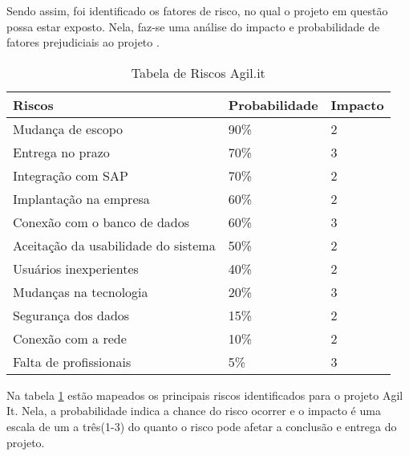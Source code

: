 Sendo assim, foi identificado os fatores de risco, no qual o projeto em questão possa estar exposto. Nela, faz-se uma análise do impacto e probabilidade de fatores prejudiciais ao projeto .
\newpage
\begin{table}[]
	\begin{tabular}{|l|l|l|}
		\hline
		\rowcolor[HTML]{EFEFEF} 
		\textbf{Riscos}                     & \textbf{Probabilidade} & \textbf{Impacto} \\ \hline
		\rowcolor[HTML]{DD7346} 
		Mudança de escopo                   & 90\%                   & 2                \\ \hline
		\rowcolor[HTML]{DD7346} 
		Entrega no prazo                    & 70\%                   & 3                \\ \hline
		\rowcolor[HTML]{DD7346} 
		Integração com SAP                  & 70\%                   & 2                \\ \hline
		\rowcolor[HTML]{FFFE65} 
		Implantação na empresa              & 60\%                   & 2                \\ \hline
		\rowcolor[HTML]{FFFE65} 
		Conexão com o banco de dados        & 60\%                   & 3                \\ \hline
		\rowcolor[HTML]{FFFE65} 
		Aceitação da usabilidade do sistema & 50\%                   & 2                \\ \hline
		\rowcolor[HTML]{FFFE65} 
		Usuários inexperientes              & 40\%                   & 2                \\ \hline
		\rowcolor[HTML]{9AFF99} 
		Mudanças na tecnologia              & 20\%                   & 3                \\ \hline
		\rowcolor[HTML]{9AFF99} 
		Segurança dos dados                 & 15\%                   & 2                \\ \hline
		\rowcolor[HTML]{9AFF99} 
		Conexão com a rede                  & 10\%                   & 2                \\ \hline
		\rowcolor[HTML]{9AFF99} 
		Falta de profissionais              & 5\%                    & 3                \\ \hline
	\end{tabular}
	\caption{\label{tebela_risco} Tabela de Riscos Agil.it}
\end{table}

Na tabela \ref{tebela_risco} estão mapeados os principais riscos identificados para o projeto Agil It. Nela, a probabilidade indica a chance do risco ocorrer e o impacto é uma escala de um a três(1-3) do quanto o risco pode afetar a conclusão e entrega do projeto.

